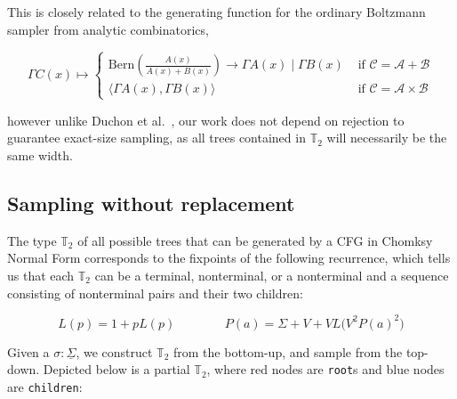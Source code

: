 \documentclass[sigplan,nonacm]{acmart}\settopmatter{printfolios=false,printccs=false,printacmref=false}
\begin{document}
This is closely related to the generating function for the ordinary Boltzmann sampler from analytic combinatorics,

\begin{equation*}
  \Gamma C(x) \mapsto \begin{cases}
  \text{Bern} \left(\frac{A(x)}{A(x) + B(x)}\right) \rightarrow \Gamma A(x) \mid \Gamma B(x) & \text{ if } \mathcal{C}=\mathcal{A}+\mathcal{B} \\
  \big\langle \Gamma A(x), \Gamma B(x)\big\rangle & \text{ if } \mathcal{C}=\mathcal{A} \times \mathcal{B}
  \end{cases}
\end{equation*}

\noindent however unlike Duchon et al.~\cite{duchon2004boltzmann}, our work does not depend on rejection to guarantee exact-size sampling, as all trees contained in $\mathbb{T}_2$ will necessarily be the same width.

\pagebreak\subsection{Sampling without replacement}\label{sec:pairing}

The type $\mathbb{T}_2$ of all possible trees that can be generated by a CFG in Chomksy Normal Form corresponds to the fixpoints of the following recurrence, which tells us that each $\mathbb{T}_2$ can be a terminal, nonterminal, or a nonterminal and a sequence consisting of nonterminal pairs and their two children:\vspace{-10pt}

\begin{equation*}
  L(p) = 1 + p L(p) \phantom{addspace} P(a) = \Sigma + V + V L\big(V^2P(a)^2\big)
\end{equation*}

Given a $\sigma: \underline\Sigma$, we construct $\mathbb{T}_2$ from the bottom-up, and sample from the top-down. Depicted below is a partial $\mathbb{T}_2$, where red nodes are \texttt{root}s and blue nodes are \texttt{children}:
\end{document}

